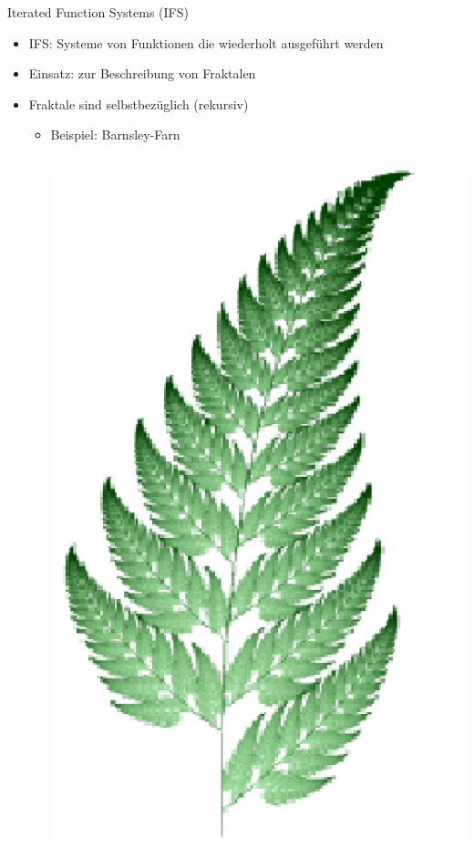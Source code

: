 \begin{frame}{Iterated Function Systems (IFS)}
\begin{itemize}
 \item IFS: Systeme von Funktionen die wiederholt
 ausgeführt werden
 \item Einsatz: zur Beschreibung von Fraktalen
 \item Fraktale sind selbstbezüglich (rekursiv)
 \begin{itemize}
   \item Beispiel: Barnsley-Farn
     \begin{columns}
	\includegraphics[width=\textwidth]{../images/BarnsleyFarn.jpg}

\end{columns}
\end{itemize}
\end{itemize}
\end{frame}

